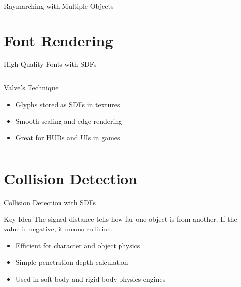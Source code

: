 \begin{frame}{Raymarching with Multiple Objects}
  \centering
  \vspace{0.5cm}
  \resizebox{0.8\linewidth}{!}{}
\end{frame}





\section{Font Rendering}
\begin{frame}{High-Quality Fonts with SDFs}
  \begin{columns}
    \begin{column}{0.6\textwidth}
      \begin{conceptbox}{Valve's Technique}
        \begin{itemize}
          \item Glyphs stored as SDFs in textures
          \item Smooth scaling and edge rendering
          \item Great for HUDs and UIs in games
        \end{itemize}
      \end{conceptbox}
    \end{column}
    \begin{column}{0.4\textwidth}
      \centering
      \resizebox{\linewidth}{!}{
        
      }
    \end{column}
  \end{columns}
\end{frame}

\section{Collision Detection}
\begin{frame}{Collision Detection with SDFs}
  \begin{conceptbox}{Key Idea}
    The signed distance tells how far one object is from another. 
    If the value is negative, it means collision.
  \end{conceptbox}

  \begin{itemize}
    \item<1-> Efficient for character and object physics
    \item<2-> Simple penetration depth calculation
    \item<3-> Used in soft-body and rigid-body physics engines
  \end{itemize}

  \vspace{0.5cm}
  \centering
\end{frame}



